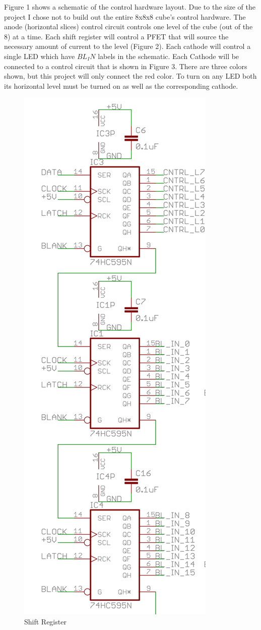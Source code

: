 \documentclass[11pt]{article} %
\begin{document}
Figure 1 shows a schematic of the control hardware layout. Due to the size of the project I chose not to build out the entire 8x8x8 cube's control hardware. The anode (horizontal slices) control circuit controls one level of the cube (out of the 8) at a time. Each shift register will control a PFET that will source the necessary amount of current to the level (Figure 2). Each cathode will control a single LED which have $BL_IN$ labels in the schematic. Each Cathode will be connected to a control circuit that is shown in Figure 3. There are three colors shown, but this project will only connect the red color. To turn on any LED both its horizontal level must be turned on as well as the corresponding cathode.

\begin{figure}[h]
\caption{Shift Register}
\includegraphics[scale=.75]{Schematic}
\centering
\end{figure}
\end{document}
